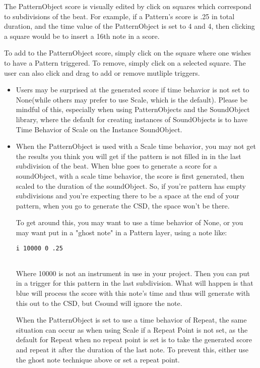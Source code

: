 The PatternObject score is visually edited by click on squares which
correspond to subdivisions of the beat. For example, if a Pattern's
score is .25 in total duration, and the time value of the PatternObject
is set to 4 and 4, then clicking a square would be to insert a 16th note
in a score.

To add to the PatternObject score, simply click on the square where one
wishes to have a Pattern triggered. To remove, simply click on a
selected square. The user can also click and drag to add or remove
mutliple triggers.

\begin{itemize}
\item
  Users may be surprised at the generated score if time behavior is not
  set to None(while others may prefer to use Scale, which is the
  default). Please be mindful of this, especially when using
  PatternObjects and the SoundObject library, where the default for
  creating instances of SoundObjects is to have Time Behavior of Scale
  on the Instance SoundObject.
\item
  When the PatternObject is used with a Scale time behavior, you may not
  get the results you think you will get if the pattern is not filled in
  in the last subdivision of the beat. When blue goes to generate a
  score for a soundObject, with a scale time behavior, the score is
  first generated, then scaled to the duration of the soundObject. So,
  if you're pattern has empty subdivisions and you're expecting there to
  be a space at the end of your pattern, when you go to generate the
  CSD, the space won't be there.

  To get around this, you may want to use a time behavior of None, or
  you may want put in a "ghost note" in a Pattern layer, using a note
  like:

\begin{verbatim}
i 10000 0 .25
    
\end{verbatim}

  Where 10000 is not an instrument in use in your project. Then you can
  put in a trigger for this pattern in the last subdivision. What will
  happen is that blue will process the score with this note's time and
  thus will generate with this out to the CSD, but Csound will ignore
  the note.

  When the PatternObject is set to use a time behavior of Repeat, the
  same situation can occur as when using Scale if a Repeat Point is not
  set, as the default for Repeat when no repeat point is set is to take
  the generated score and repeat it after the duration of the last note.
  To prevent this, either use the ghost note technique above or set a
  repeat point.
\end{itemize}
